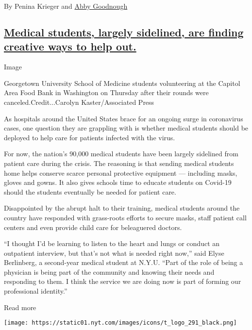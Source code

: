By Penina Krieger and
\href{https://www.nytimes.com/by/abby-goodnough}{Abby Goodnough}

\hypertarget{medical-students-largely-sidelined-are-finding-creative-ways-to-help-out}{%
\subsection{\texorpdfstring{\protect\hyperlink{medical-students-largely-sidelined-are-finding-creative-ways-to-help-out}{Medical
students, largely sidelined, are finding creative ways to help
out.}}{Medical students, largely sidelined, are finding creative ways to help out.}}\label{medical-students-largely-sidelined-are-finding-creative-ways-to-help-out}}

Image

Georgetown University School of Medicine students volunteering at the
Capitol Area Food Bank in Washington on Thursday after their rounds were
canceled.Credit...Carolyn Kaster/Associated Press

As hospitals around the United States brace for an ongoing surge in
coronavirus cases, one question they are grappling with is whether
medical students should be deployed to help care for patients infected
with the virus.

For now, the nation's 90,000 medical students have been largely
sidelined from patient care during the crisis. The reasoning is that
sending medical students home helps conserve scarce personal protective
equipment --- including masks, gloves and gowns. It also gives schools
time to educate students on Covid-19 should the students eventually be
needed for patient care.

Disappointed by the abrupt halt to their training, medical students
around the country have responded with grass-roots efforts to secure
masks, staff patient call centers and even provide child care for
beleaguered doctors.

``I thought I'd be learning to listen to the heart and lungs or conduct
an outpatient interview, but that's not what is needed right now,'' said
Elyse Berlinberg, a second-year medical student at N.Y.U. ``Part of the
role of being a physician is being part of the community and knowing
their needs and responding to them. I think the service we are doing now
is part of forming our professional identity.''

Read more

\texttt{[image: https://static01.nyt.com/images/icons/t\_logo\_291\_black.png]}

